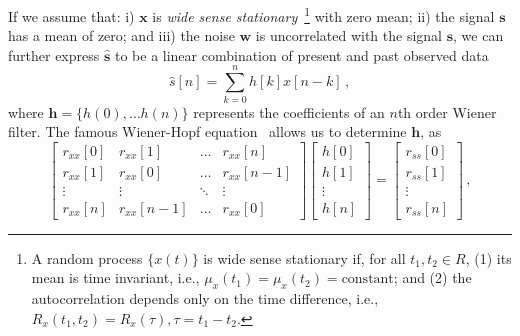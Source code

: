 \documentclass[paper-main.tex]{subfiles}
\begin{document}
If we assume that: i) $\textbf{x}$ is \emph{wide sense stationary}~\footnote{ A random process $\{x(t)\}$ is wide sense stationary if, for all $t_1,t_2 \in R$, (1) its mean is time invariant, i.e., $\mu_x(t_1)=\mu_x(t_2)=\text{constant}$; and (2) the autocorrelation depends only on the time difference, i.e., $R_x(t_1,t_2)=R_x(\tau),\tau=t_1-t_2$.} with zero mean; ii) the signal $\textbf{s}$ has a mean of zero; and iii) the noise $\textbf{w}$ is uncorrelated with the signal $\textbf{s}$, we can further express $\hat{\textbf{s}}$ to be a linear combination of present and past observed data
\begin{equation}
\hat{{s}}[n]=\sum_{k=0}^{n}h[k]x[n-k]\,,
\end{equation}
where $\textbf{h}=\{h(0),\dots h(n)\}$ represents the coefficients of an $n$th order Wiener filter.
The famous Wiener-Hopf equation~\citep{noble1959methods} allows us to determine $\textbf{h}$, as\begin{equation}
\label{eqn:wiener-hopf}
\begin{bmatrix}  
r_{xx}[0]&r_{xx}[1]&\dots& r_{xx}[n]\\
r_{xx}[1]&r_{xx}[0]&\dots &r_{xx}[n-1]\\
\vdots&\vdots&\ddots&\vdots\\
r_{xx}[n]&r_{xx}[n-1]&\dots &r_{xx}[0]
\end{bmatrix}
\begin{bmatrix}
h[0]\\
h[1]\\
\vdots\\
h[n]
\end{bmatrix}=
\begin{bmatrix}
r_{ss}[0]\\
r_{ss}[1]\\
\vdots\\
r_{ss}[n]
\end{bmatrix}\,,
\end{equation}
\end{document}
